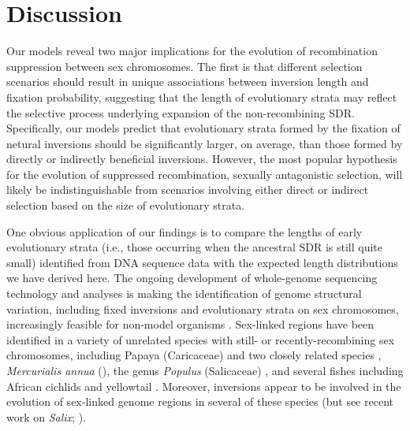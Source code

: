\documentclass{article}
\begin{document}
\section*{Discussion} \label{sec:Discussion}

Our models reveal two major implications for the evolution of recombination suppression between sex chromosomes. The first is that different selection scenarios should result in unique associations between inversion length and fixation probability, suggesting that the length of evolutionary strata may reflect the selective process underlying expansion of the non-recombining SDR. Specifically, our models predict that evolutionary strata formed by the fixation of netural inversions should be significantly larger, on average, than those formed by directly or indirectly beneficial inversions. However, the most popular hypothesis for the evolution of suppressed recombination, sexually antagonistic selection, will likely be indistinguishable from scenarios involving either direct or indirect selection based on the size of evolutionary strata.

One obvious application of our findings is to compare the lengths of early evolutionary strata (i.e., those occurring when the ancestral SDR is still quite small) identified from DNA sequence data with the expected length distributions we have derived here. The ongoing development of whole-genome sequencing technology and analyses is making the identification of genome structural variation, including fixed inversions and evolutionary strata on sex chromosomes, increasingly feasible for non-model organisms \citep[reviewed in ][]{Muyle2017, Charlesworth2018,PandayAzad2016}. Sex-linked regions have been identified in a variety of unrelated species with still- or recently-recombining sex chromosomes, including Papaya (Caricaceae) and two closely related species \citep{Wang2012, Lovene2015}, {\itshape Mercurialis annua} (\citealt{VeltsosPannell2019}), the genus {\itshape Populus}  (Salicaceae) \citep[reviewed in][]{HobzaEtAl2018}, and several fishes including African cichlids \citep{GammerdingerKocher2018} and yellowtail \citep{KoyamaEtAl2015}. Moreover, inversions appear to be involved in the evolution of sex-linked genome regions in several of these species (but see recent work on {\itshape Salix}; \citealt{AlmeidaMank2019}). 
\end{document}
